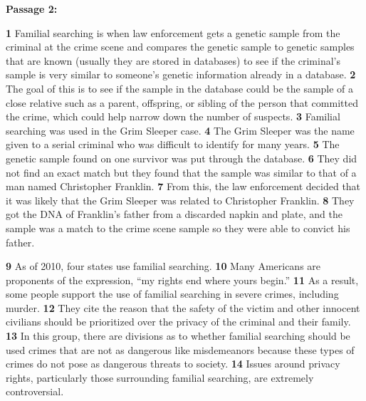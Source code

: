 \bigskip
\textbf{Passage 2:}

\bigskip
\indent \textbf{1} Familial searching is when law enforcement gets a genetic sample from the criminal at the crime scene and compares the genetic sample to genetic samples that are known (usually they are stored in databases) to see if the criminal’s sample is very similar to someone’s genetic information already in a database.  \textbf{2} The goal of this is to see if the sample in the database could be the sample of a close relative such as a parent, offspring, or sibling of the person that committed the crime, which could help narrow down the number of suspects. \textbf{3} Familial searching was used in the Grim Sleeper case. \textbf{4} The Grim Sleeper was the name given to a serial criminal who was difficult to identify for many years. \textbf{5} The genetic sample found on one survivor was put through the database. \textbf{6} They did not find an exact match but they found that the sample was similar to that of a man named Christopher Franklin. \textbf{7} From this, the law enforcement decided that it was likely that the Grim Sleeper was related to Christopher Franklin. \textbf{8} They got the DNA of Franklin’s father from a discarded napkin and plate, and the sample was a match to the crime scene sample so they were able to convict his father. 

\indent \textbf{9} As of 2010, four states use familial searching. \textbf{10} Many Americans are proponents of the expression, ``my rights end where yours begin.'' \textbf{11} As a result, some people support the use of familial searching in severe crimes, including murder. \textbf{12} They cite the reason that the safety of the victim and other innocent civilians should be prioritized over the privacy of the criminal and their family. \textbf{13} In this group, there are divisions as to whether familial searching should be used crimes that are not as dangerous like misdemeanors because these types of crimes do not pose as dangerous threats to society. \textbf{14} Issues around privacy rights, particularly those surrounding familial searching, are extremely controversial. 

